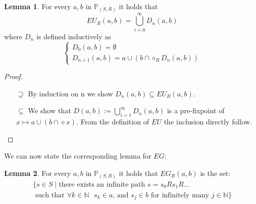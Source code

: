 \documentclass[11pt]{article}
\theoremstyle{definition}
\newtheorem*{lemma}{Lemma}
\begin{document}
\begin{lemma}\label{EU_as_union}
        For every $a,b$ in $\mathbb{P}_{(S,R)}$ it holds that \[EU_R(a,b)=\bigcup_{i=0}^{\infty}D_n(a,b)\] where $D_n$ is defined inductively as
        \begin{equation*}
            \begin{cases}
                D_0(a,b)=\emptyset\\
                D_{n+1}(a,b)=a\cup(b\cap\diamond_R D_n(a,b))
            \end{cases}
        \end{equation*}
        
\end{lemma}

\begin{proof}
    \begin{itemize}
        \item[$\supseteq$] By induction on n we show $D_n(a,b) \subseteq EU_R(a,b)$.
        \item[$\subseteq$] We show that $D(a,b) := \bigcup_{i=1}^{\infty}D_n(a,b)$ is a pre-fixpoint of $x \mapsto a \cup (b \cap \diamond x)$. From the definition of $EU$ the inclusion directly follow.
    \end{itemize}
\end{proof}

We can now state the corresponding lemma for $EG$:
\begin{lemma}\label{EG_as_set}
    For every $a,b$ in $\mathbb{P}_{(S,R)}$ it holds that $EG_R(a,b)$ is the set:
\begin{multline*}
    \{s\in S\mid \mbox{there exists an infinite path } s=s_0Rs_1R\ldots\\
    \mbox{ such that }\forall k\in \mathbb{N} \mbox{ } s_k\in a\mbox{, and } s_{j}\in b \mbox{ for infinitely many } j \in\mathbb{N}\}
\end{multline*}
\end{lemma}
\end{document}
